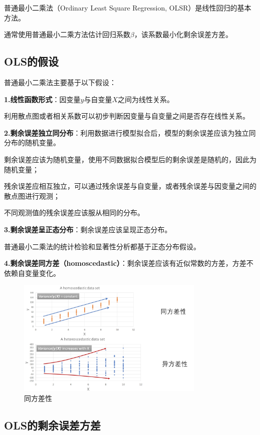 普通最小二乘法（Ordinary Least Square Regression, OLSR）是线性回归的基本方法。

通常使用普通最小二乘方法估计回归系数$\beta$，该系数最小化剩余误差方差。

\subsection{OLS的假设}

普通最小二乘法主要基于以下假设：

\textbf{1.线性函数形式}：因变量$y$与自变量$X$之间为线性关系。

利用散点图或者相关系数可以初步判断因变量与自变量之间是否存在线性关系。

\textbf{2.剩余误差独立同分布}：利用数据进行模型拟合后，模型的剩余误差应该为独立同分布的随机变量。

剩余误差应该为随机变量，使用不同数据拟合模型后的剩余误差是随机的，因此为随机变量；

残余误差应相互独立，可以通过残余误差与自变量，或者残余误差与因变量之间的散点图进行观测；

不同观测值的残余误差应该服从相同的分布。

\textbf{3.剩余误差呈正态分布}：剩余误差应该呈现正态分布。

普通最小二乘法的统计检验和显著性分析都基于正态分布假设。

\textbf{4.剩余误差同方差（homoscedastic）}：剩余误差应该有近似常数的方差，方差不依赖自变量变化。

\begin{figure}[h]
    \centering
    \includegraphics[width=0.8\textwidth]{pic/2.1.1.png}
    \caption{同方差性}
\end{figure}

\subsection{OLS的剩余误差方差}

